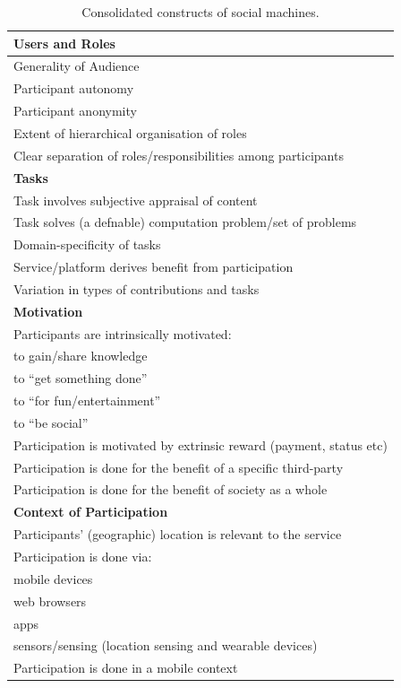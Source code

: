 \documentclass{sig-alternate}
\begin{document}
\begin{table}[htb]
\begin{center}
\begin{tabular}{|p{8cm}|}
\hline
{\bf Users and Roles} \\
\hline
Generality of Audience \\
Participant autonomy \\
Participant anonymity \\
Extent of hierarchical organisation of roles \\
Clear separation of roles/responsibilities among participants \\
\hline
{\bf Tasks} \\
\hline
Task involves subjective appraisal of content \\
Task solves (a defnable) computation problem/set of problems\\
Domain-specificity of tasks \\
Service/platform derives benefit from participation \\
Variation in types of contributions and tasks \\
{\bf Motivation} \\
Participants are intrinsically motivated:\\
\hspace{1cm} to gain/share knowledge \\
\hspace{1cm} to ``get something done'' \\
\hspace{1cm} to ``for fun/entertainment''\\
\hspace{1cm} to ``be social'' \\
Participation is motivated by extrinsic reward (payment, status etc) \\
Participation is done for the benefit of a specific third-party \\
Participation is done for the benefit of society as a whole \\
\hline
{\bf Context of Participation} \\
\hline
Participants' (geographic) location is relevant to the service \\
Participation is done via: \\
\hspace{1cm} mobile devices \\
\hspace{1cm} web browsers \\
\hspace{1cm} apps \\
\hspace{1cm} sensors/sensing (location sensing and wearable devices) \\
Participation is done in a mobile context \\
\hline
\end{tabular}
\end{center}
\caption{Consolidated constructs of social machines.} \label{table:constructs}
\end{table}
\end{document}
